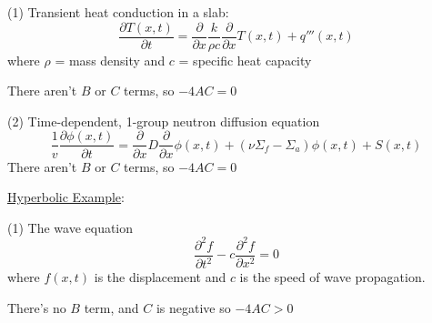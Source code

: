 \documentclass[12pt]{article}
\newlength{\up}
\newcommand{\Macro}{\ensuremath{\Sigma}}
\begin{document}
(1) Transient heat conduction in a slab:
%
\begin{equation}
\frac{\partial T(x,t)}{\partial t} = \frac{\partial}{\partial x} \frac{k}{\rho c} \frac{\partial}{\partial x} T(x,t) + q'''(x,t) \nonumber
\end{equation}
%
where $\rho$ = mass density and $c$ = specific heat capacity

\noindent There aren't $B$ or $C$ terms, so $-4AC = 0$


\vspace*{2em}
(2) Time-dependent, 1-group neutron diffusion equation
%
\begin{equation}
\frac{1}{v} \frac{\partial \phi(x,t)}{\partial t} = \frac{\partial}{\partial x} D \frac{\partial}{\partial x} \phi(x,t) + (\nu \Macro_f - \Macro_a) \phi(x,t) + S(x,t) \nonumber
\end{equation}
%
There aren't $B$ or $C$ terms, so $-4AC = 0$

\vspace*{1em}
\noindent \underline{Hyperbolic Example}:

(1) The wave equation
%
\begin{equation}
\frac{\partial^2 f}{\partial t^2} - c \frac{\partial^2 f}{\partial x^2} = 0
\end{equation}
%
where $f(x,t)$ is the displacement and $c$ is the speed of wave propagation.

\noindent There's no $B$ term, and $C$ is negative so $-4AC > 0$

%
%
\end{document}
